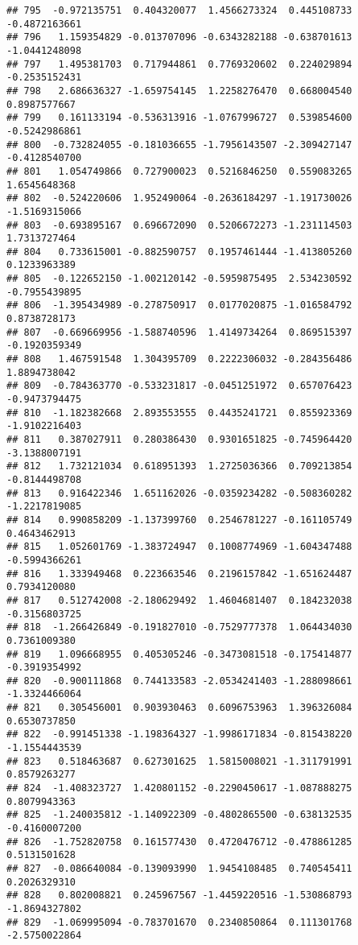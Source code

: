 \documentclass[
]{article}
\begin{document}
\begin{verbatim}
## 795  -0.972135751  0.404320077  1.4566273324  0.445108733 -0.4872163661
## 796   1.159354829 -0.013707096 -0.6343282188 -0.638701613 -1.0441248098
## 797   1.495381703  0.717944861  0.7769320602  0.224029894 -0.2535152431
## 798   2.686636327 -1.659754145  1.2258276470  0.668004540  0.8987577667
## 799   0.161133194 -0.536313916 -1.0767996727  0.539854600 -0.5242986861
## 800  -0.732824055 -0.181036655 -1.7956143507 -2.309427147 -0.4128540700
## 801   1.054749866  0.727900023  0.5216846250  0.559083265  1.6545648368
## 802  -0.524220606  1.952490064 -0.2636184297 -1.191730026 -1.5169315066
## 803  -0.693895167  0.696672090  0.5206672273 -1.231114503  1.7313727464
## 804   0.733615001 -0.882590757  0.1957461444 -1.413805260  0.1233963389
## 805  -0.122652150 -1.002120142 -0.5959875495  2.534230592 -0.7955439895
## 806  -1.395434989 -0.278750917  0.0177020875 -1.016584792  0.8738728173
## 807  -0.669669956 -1.588740596  1.4149734264  0.869515397 -0.1920359349
## 808   1.467591548  1.304395709  0.2222306032 -0.284356486  1.8894738042
## 809  -0.784363770 -0.533231817 -0.0451251972  0.657076423 -0.9473794475
## 810  -1.182382668  2.893553555  0.4435241721  0.855923369 -1.9102216403
## 811   0.387027911  0.280386430  0.9301651825 -0.745964420 -3.1388007191
## 812   1.732121034  0.618951393  1.2725036366  0.709213854 -0.8144498708
## 813   0.916422346  1.651162026 -0.0359234282 -0.508360282 -1.2217819085
## 814   0.990858209 -1.137399760  0.2546781227 -0.161105749  0.4643462913
## 815   1.052601769 -1.383724947  0.1008774969 -1.604347488 -0.5994366261
## 816   1.333949468  0.223663546  0.2196157842 -1.651624487  0.7934120080
## 817   0.512742008 -2.180629492  1.4604681407  0.184232038 -0.3156803725
## 818  -1.266426849 -0.191827010 -0.7529777378  1.064434030  0.7361009380
## 819   1.096668955  0.405305246 -0.3473081518 -0.175414877 -0.3919354992
## 820  -0.900111868  0.744133583 -2.0534241403 -1.288098661 -1.3324466064
## 821   0.305456001  0.903930463  0.6096753963  1.396326084  0.6530737850
## 822  -0.991451338 -1.198364327 -1.9986171834 -0.815438220 -1.1554443539
## 823   0.518463687  0.627301625  1.5815008021 -1.311791991  0.8579263277
## 824  -1.408323727  1.420801152 -0.2290450617 -1.087888275  0.8079943363
## 825  -1.240035812 -1.140922309 -0.4802865500 -0.638132535 -0.4160007200
## 826  -1.752820758  0.161577430  0.4720476712 -0.478861285  0.5131501628
## 827  -0.086640084 -0.139093990  1.9454108485  0.740545411  0.2026329310
## 828   0.802008821  0.245967567 -1.4459220516 -1.530868793 -1.8694327802
## 829  -1.069995094 -0.783701670  0.2340850864  0.111301768 -2.5750022864

\end{verbatim}
\end{document}

